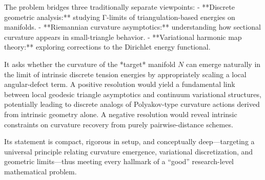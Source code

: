 The problem bridges three traditionally separate viewpoints:
- **Discrete geometric analysis:** studying Γ-limits of triangulation-based energies on manifolds.
- **Riemannian curvature asymptotics:** understanding how sectional curvature appears in small-triangle behavior.
- **Variational harmonic map theory:** exploring corrections to the Dirichlet energy functional.

It asks whether the curvature of the *target* manifold \(N\) can emerge naturally in the limit of intrinsic discrete tension energies by appropriately scaling a local angular-defect term.  
A positive resolution would yield a fundamental link between local geodesic triangle asymptotics and continuum variational structures, potentially leading to discrete analogs of Polyakov-type curvature actions derived from intrinsic geometry alone. A negative resolution would reveal intrinsic constraints on curvature recovery from purely pairwise-distance schemes.  

Its statement is compact, rigorous in setup, and conceptually deep—targeting a universal principle relating curvature emergence, variational discretization, and geometric limits—thus meeting every hallmark of a “good” research-level mathematical problem.